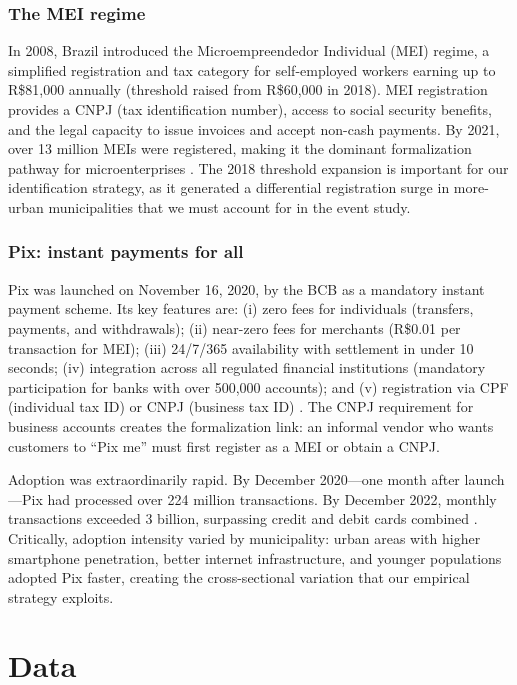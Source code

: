 \documentclass[12pt]{article}
\begin{document}
\subsubsection*{The MEI regime} In 2008, Brazil introduced the Microempreendedor Individual (MEI) regime, a simplified registration and tax category for self-employed workers earning up to R\$81,000 annually (threshold raised from R\$60,000 in 2018). MEI registration provides a CNPJ (tax identification number), access to social security benefits, and the legal capacity to issue invoices and accept non-cash payments. By 2021, over 13 million MEIs were registered, making it the dominant formalization pathway for microenterprises \citep{sebrae2022mei}. The 2018 threshold expansion is important for our identification strategy, as it generated a differential registration surge in more-urban municipalities that we must account for in the event study.

\subsubsection*{Pix: instant payments for all} Pix was launched on November 16, 2020, by the BCB as a mandatory instant payment scheme. Its key features are: (i) zero fees for individuals (transfers, payments, and withdrawals); (ii) near-zero fees for merchants (R\$0.01 per transaction for MEI); (iii) 24/7/365 availability with settlement in under 10 seconds; (iv) integration across all regulated financial institutions (mandatory participation for banks with over 500,000 accounts); and (v) registration via CPF (individual tax ID) or CNPJ (business tax ID) \citep{bcb2020pix}. The CNPJ requirement for business accounts creates the formalization link: an informal vendor who wants customers to ``Pix me'' must first register as a MEI or obtain a CNPJ.

Adoption was extraordinarily rapid. By December 2020---one month after launch---Pix had processed over 224 million transactions. By December 2022, monthly transactions exceeded 3 billion, surpassing credit and debit cards combined \citep{bcb2023pix}. Critically, adoption intensity varied by municipality: urban areas with higher smartphone penetration, better internet infrastructure, and younger populations adopted Pix faster, creating the cross-sectional variation that our empirical strategy exploits.

\section{Data}
\end{document}

